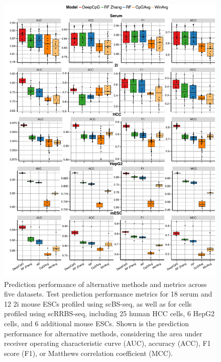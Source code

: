 \begin{figure}[htbp!]
\centering
\includegraphics[width=1.0\textwidth]{dsets}
\caption[Prediction performance of alternative methods and metrics across five datasets.]{Prediction performance of alternative methods and metrics across five datasets. Test prediction performance metrics for 18 serum and 12 2i mouse ESCs profiled using scBS-seq, as well as for cells profiled using scRRBS-seq, including 25 human HCC cells, 6 HepG2 cells, and 6 additional mouse ESCs. Shown is the prediction performance for alternative methods, considering the area under receiver operating characteristic curve (AUC), accuracy (ACC), F1 score (F1), or Matthews correlation coefficient (MCC).}
\label{fig:dcpg_eval_dsets_all}
\end{figure}

